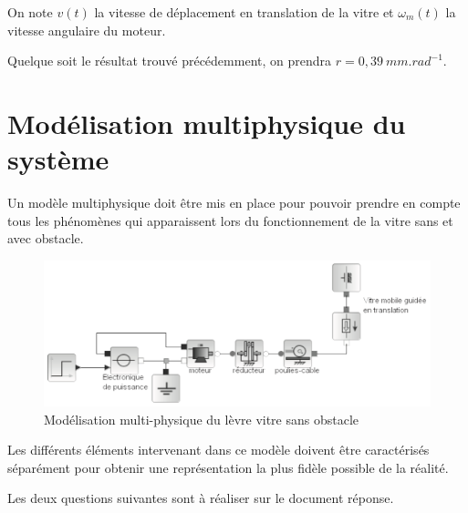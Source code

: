 On note $v(t)$ la vitesse de déplacement en translation de la vitre et $\omega_m(t)$ la vitesse angulaire du moteur.


Quelque soit le résultat trouvé précédemment, on prendra $r=0,39\ mm.rad^{-1}$.



\section{Modélisation multiphysique du système}

Un modèle multiphysique doit être mis en place pour pouvoir prendre en compte tous les phénomènes qui apparaissent lors du fonctionnement de la vitre sans et avec obstacle.

\begin{figure}[!h]
\centering\includegraphics[width=0.85\linewidth]{img/figure05}
 \caption{Modélisation multi-physique du lèvre vitre sans obstacle}
 \label{img05}
\end{figure}

Les différents éléments intervenant dans ce modèle doivent être caractérisés séparément pour obtenir une représentation la plus fidèle possible de la réalité. 


Les deux questions suivantes sont à réaliser sur le document réponse.


